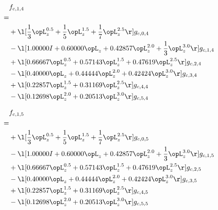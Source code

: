 \begin{alignat}{2} 
\label{eq:f_14_0} 
& f_{c,1,4} \nonumber \\ 
 = \\ 
& + \l[ \frac{1}{3} \opL_z^{0.5} + \frac{1}{5} \opL_z^{1.5} + \frac{1}{7} \opL_z^{2.5}  \r] g_{c,0,4} \nonumber \\ 
& - \l[  1.00000 I +  0.60000 \opL_z +  0.42857 \opL_z^{2.0} + \frac{1}{3} \opL_z^{3.0}  \r] g_{c,1,4} \nonumber \\ 
& + \l[  0.66667 \opL_z^{0.5} +  0.57143 \opL_z^{1.5} +  0.47619 \opL_z^{2.5}  \r] g_{c,2,4} \nonumber \\ 
& - \l[  0.40000 \opL_z +  0.44444 \opL_z^{2.0} +  0.42424 \opL_z^{3.0}  \r] g_{c,3,4} \nonumber \\ 
& + \l[  0.22857 \opL_z^{1.5} +  0.31169 \opL_z^{2.5}  \r] g_{c,4,4} \nonumber \\ 
& - \l[  0.12698 \opL_z^{2.0} +  0.20513 \opL_z^{3.0}  \r] g_{c,5,4} \nonumber \\ 
\end{alignat} 


\begin{alignat}{2} 
\label{eq:f_15_0} 
& f_{c,1,5} \nonumber \\ 
 = \\ 
& + \l[ \frac{1}{3} \opL_z^{0.5} + \frac{1}{5} \opL_z^{1.5} + \frac{1}{7} \opL_z^{2.5}  \r] g_{c,0,5} \nonumber \\ 
& - \l[  1.00000 I +  0.60000 \opL_z +  0.42857 \opL_z^{2.0} + \frac{1}{3} \opL_z^{3.0}  \r] g_{c,1,5} \nonumber \\ 
& + \l[  0.66667 \opL_z^{0.5} +  0.57143 \opL_z^{1.5} +  0.47619 \opL_z^{2.5}  \r] g_{c,2,5} \nonumber \\ 
& - \l[  0.40000 \opL_z +  0.44444 \opL_z^{2.0} +  0.42424 \opL_z^{3.0}  \r] g_{c,3,5} \nonumber \\ 
& + \l[  0.22857 \opL_z^{1.5} +  0.31169 \opL_z^{2.5}  \r] g_{c,4,5} \nonumber \\ 
& - \l[  0.12698 \opL_z^{2.0} +  0.20513 \opL_z^{3.0}  \r] g_{c,5,5} \nonumber \\ 
\end{alignat} 


